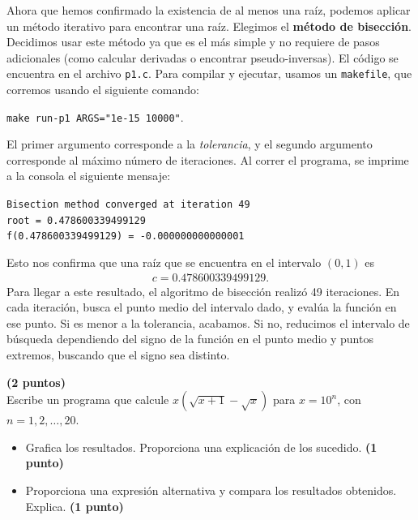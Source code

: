 \begin{solution}
	Ahora que hemos confirmado la existencia de al menos una ra\'iz, podemos
	aplicar un m\'etodo iterativo para encontrar una ra\'iz. Elegimos el
	\textbf{m\'etodo de bisecci\'on}. Decidimos usar este m\'etodo ya que es el
	m\'as simple y no requiere de pasos adicionales (como calcular derivadas o
	encontrar pseudo-inversas). El c\'odigo se encuentra en el archivo
	\texttt{p1.c}. Para compilar y ejecutar, usamos un \texttt{makefile}, que
	corremos usando el siguiente comando:
	\begin{center}
		\texttt{make run-p1 ARGS="1e-15 10000"}.
	\end{center}
	El primer argumento corresponde a la \textit{tolerancia}, y el segundo
	argumento corresponde al m\'aximo n\'umero de iteraciones. Al correr el
	programa, se imprime a la consola el siguiente mensaje:
	\begin{center}
		\texttt{Bisection method converged at iteration 49\\
			root = 0.478600339499129\\
			f(0.478600339499129) = -0.000000000000001}
	\end{center}
	Esto nos confirma que una ra\'iz que se encuentra en el intervalo $ (0,1) $ es
	\begin{align*}
		c = 0.478600339499129.
	\end{align*}
	Para llegar a este resultado, el algoritmo de bisecci\'on realiz\'o 49
	iteraciones. En cada iteraci\'on, busca el punto medio del intervalo dado, y
	eval\'ua la funci\'on en ese punto. Si es menor a la tolerancia, acabamos.
	Si no, reducimos el intervalo de b\'usqueda dependiendo del signo de la
	funci\'on en el punto medio y puntos extremos, buscando que el signo sea
	distinto.
\end{solution}


\begin{problem}
\textbf{(2 puntos)}\\
Escribe un programa que calcule $ x(\sqrt{x+1}-\sqrt{x}) $ para $ x = 10^n $, con $ n = 1, 2, \dots, 20 $.
\begin{itemize}
	\item Grafica los resultados. Proporciona una explicaci\'on de los sucedido. \textbf{(1 punto)}
	\item Proporciona una expresi\'on alternativa y compara los resultados obtenidos. Explica. \textbf{(1 punto)}
\end{itemize}
\end{problem}

